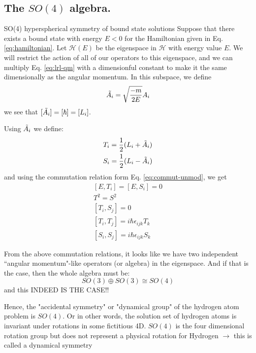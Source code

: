 \documentclass{beamer}
\begin{document}
\subsection{The $SO(4)$ algebra.}
\begin{frame}{SO(4) hyperspherical symmetry of bound state solutions}
    Suppose that there exists a bound state with energy $E < 0$ for the Hamiltonian given in Eq.\ref{eq:hamiltonian}. Let $\mathcal{H}(E)$ be the eigenspace in $\mathcal{H}$ with energy value $E$. We will restrict the action of all of our operators to this eigenspace, and we can multiply Eq. \ref{eq:lrl-qm} with a dimensionful constant to make it the same dimensionally as the angular momentum. In this subspace, we define
    \begin{equation}
        \label{eq:lrl-angl}
        \Tilde{A_i} = \sqrt{\frac{-m}{2E}} A_i
    \end{equation}
    we see that $[\Tilde{A_i}] = [\hbar] = [L_i]$. 
\end{frame}

\begin{frame}{}
    Using $\Tilde{A_i}$ we define:
    \begin{equation}
        \begin{gathered}
            T_i = \frac{1}{2} (L_i + \Tilde{A}_i)\\
            S_i = \frac{1}{2} (L_i - \Tilde{A} _i)
        \end{gathered}
    \end{equation}
    and using the commutation relation form Eq. \ref{eq:commut-unmod}, we get
    \begin{equation}
    \begin{gathered}
    [E, T_i] = [E, S_i] = 0\\
    T^2 = S^2  \\
    [T_i, S_j] = 0 \\
    [T_i, T_j] = i \hbar\epsilon_{ijk} T_k  \\ 
    [S_i, S_j] = i \hbar\epsilon_{ijk} S_k
    \end{gathered}
    \end{equation}
\end{frame}
\begin{frame}{}
    From the above commutation relations, it looks like we have two independent ``angular momentum"-like operators (or algebra) in the eigenspace. And if that is the case, then the whole algebra must be: 
    \[SO(3) \oplus  SO(3) \cong SO(4)\]
    and this INDEED IS THE CASE!! 
    
    Hence, the "accidental symmetry" or "dynamical group" of the hydrogen atom problem is $SO(4)$. Or in other words, the solution set of hydrogen atoms is invariant under rotations in some fictitious 4D. $SO(4)$ is the four dimensional rotation group but does not represent a physical rotation for Hydrogen $\longrightarrow$ this is called a dynamical symmetry
\end{frame}
\end{document}
